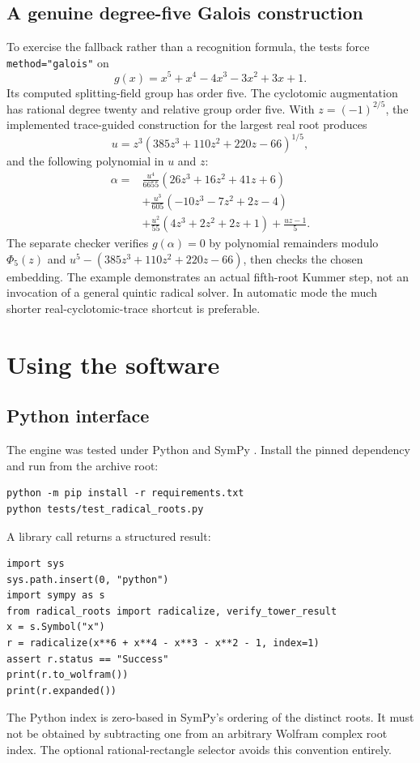 \documentclass[11pt,a4paper]{article}
\theoremstyle{definition}\newtheorem{definition}[theorem]{Definition}
\theoremstyle{remark}\newtheorem{remark}[theorem]{Remark}
\newcommand{\code}[1]{\texttt{#1}}
\begin{document}
\subsection{A genuine degree-five Galois construction}\label{sec:c5}
To exercise the fallback rather than a recognition formula, the tests force
\code{method="galois"} on
\[
 g(x)=x^5+x^4-4x^3-3x^2+3x+1.
\]
Its computed splitting-field group has order five. The cyclotomic
augmentation has rational degree twenty and relative group order five.
With $z=(-1)^{2/5}$, the implemented trace-guided construction for the
largest real root produces
\[
 u=z^3(385z^3+110z^2+220z-66)^{1/5},
\]
and the following polynomial in $u$ and $z$:
\begin{align*}
 \alpha={}&\frac{u^4}{6655}(26z^3+16z^2+41z+6)\\
 &+\frac{u^3}{605}(-10z^3-7z^2+2z-4)\\
 &+\frac{u^2}{55}(4z^3+2z^2+2z+1)+\frac{uz-1}{5}.
\end{align*}
The separate checker verifies $g(\alpha)=0$ by polynomial remainders
modulo $\Phi_5(z)$ and $u^5-(385z^3+110z^2+220z-66)$, then checks the
chosen embedding. The example demonstrates an actual fifth-root Kummer
step, not an invocation of a general quintic radical solver. In automatic
mode the much shorter real-cyclotomic-trace shortcut is preferable.

\section{Using the software}
\subsection{Python interface}
The engine was tested under Python \TestPython{} and SymPy \TestSymPy{}.
Install the pinned dependency and run from the archive root:
\begin{lstlisting}
python -m pip install -r requirements.txt
python tests/test_radical_roots.py
\end{lstlisting}
A library call returns a structured result:
\begin{lstlisting}
import sys
sys.path.insert(0, "python")
import sympy as s
from radical_roots import radicalize, verify_tower_result
x = s.Symbol("x")
r = radicalize(x**6 + x**4 - x**3 - x**2 - 1, index=1)
assert r.status == "Success"
print(r.to_wolfram())
print(r.expanded())
\end{lstlisting}
The Python index is zero-based in SymPy's ordering of the distinct roots.
It must not be obtained by subtracting one from an arbitrary Wolfram complex
root index. The optional rational-rectangle selector avoids this convention
entirely.
\end{document}
